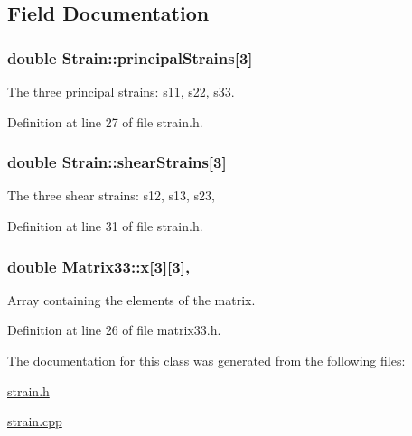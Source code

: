 \subsection{Field Documentation}
\hypertarget{classStrain_a172c6ef4593e35bc9280a2dafde61475}{
\subsubsection[{principal\-Strains}]{\setlength{\rightskip}{0pt plus 5cm}double Strain\-::principal\-Strains\mbox{[}3\mbox{]}\hspace{0.3cm}{\ttfamily [protected]}}}\label{d1/d3c/classStrain_a172c6ef4593e35bc9280a2dafde61475}
The three principal strains\-: s11, s22, s33. 

Definition at line 27 of file strain.\-h.

\hypertarget{classStrain_afbc4d1b573860bda614a43f767b8b272}{
\subsubsection[{shear\-Strains}]{\setlength{\rightskip}{0pt plus 5cm}double Strain\-::shear\-Strains\mbox{[}3\mbox{]}\hspace{0.3cm}{\ttfamily [protected]}}}\label{d1/d3c/classStrain_afbc4d1b573860bda614a43f767b8b272}
The three shear strains\-: s12, s13, s23, 

Definition at line 31 of file strain.\-h.

\hypertarget{classMatrix33_af7f01fa466616eb7c8eda2e4d9f85cdd}{
\subsubsection[{x}]{\setlength{\rightskip}{0pt plus 5cm}double Matrix33\-::x\mbox{[}3\mbox{]}\mbox{[}3\mbox{]}\hspace{0.3cm}{\ttfamily [protected]}, {\ttfamily [inherited]}}}\label{de/d82/classMatrix33_af7f01fa466616eb7c8eda2e4d9f85cdd}


Array containing the elements of the matrix. 



Definition at line 26 of file matrix33.\-h.



The documentation for this class was generated from the following files\-:\begin{DoxyCompactItemize}
\item 
\hyperlink{strain_8h}{strain.\-h}\item 
\hyperlink{strain_8cpp}{strain.\-cpp}\end{DoxyCompactItemize}
